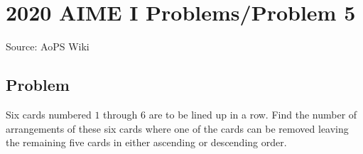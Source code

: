 \documentclass[12pt]{article}
\begin{document}
\section*{{2020 AIME I Problems/Problem 5}}
Source: AoPS Wiki

\subsection*{Problem}
Six cards numbered $1$ through $6$ are to be lined up in a row. Find the number of arrangements of these six cards where one of the cards can be removed leaving the remaining five cards in either ascending or descending order.
\end{document}
